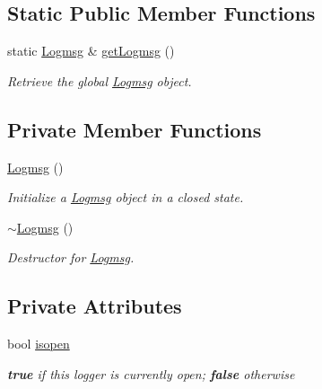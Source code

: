 \subsection*{\-Static \-Public \-Member \-Functions}
\begin{DoxyCompactItemize}
\item 
static \hyperlink{classLibWheel_1_1Logmsg}{\-Logmsg} \& \hyperlink{classLibWheel_1_1Logmsg_a787c1e247b67b38557347b55a4171b07}{get\-Logmsg} ()
\begin{DoxyCompactList}\small\item\em \-Retrieve the global \hyperlink{classLibWheel_1_1Logmsg}{\-Logmsg} object. \end{DoxyCompactList}\end{DoxyCompactItemize}
\subsection*{\-Private \-Member \-Functions}
\begin{DoxyCompactItemize}
\item 
\hyperlink{classLibWheel_1_1Logmsg_a1de22388d00911e6c37c231430355464}{\-Logmsg} ()
\begin{DoxyCompactList}\small\item\em \-Initialize a \hyperlink{classLibWheel_1_1Logmsg}{\-Logmsg} object in a closed state. \end{DoxyCompactList}\item 
\hyperlink{classLibWheel_1_1Logmsg_a97eafac148d76317ccf081729d7c058b}{$\sim$\-Logmsg} ()
\begin{DoxyCompactList}\small\item\em \-Destructor for \hyperlink{classLibWheel_1_1Logmsg}{\-Logmsg}. \end{DoxyCompactList}\end{DoxyCompactItemize}
\subsection*{\-Private \-Attributes}
\begin{DoxyCompactItemize}
\item 
bool \hyperlink{classLibWheel_1_1Logmsg_ab5647829f4a986be079f9a10e87d5dfb}{isopen}
\begin{DoxyCompactList}\small\item\em {\bfseries true} if this logger is currently open; {\bfseries false} otherwise \end{DoxyCompactList}\end{DoxyCompactItemize}


